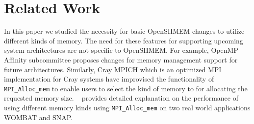 \section{Related Work}
\label{src:relate}
In this paper we studied the necessity for basic OpenSHMEM changes
to utilize different kinds of memory. The need for these features
for supporting upcoming system architectures are not specific to
OpenSHMEM. %
For example, OpenMP~\cite{openmp} Affinity subcommittee proposes changes
for memory management support for future architectures.
Similarly, Cray MPICH which is an optimized MPI
implementation for Cray systems have improvised the functionality of
\texttt{MPI\_Alloc\_mem} to enable users to select the kind of memory to
for allocating the requested memory size. ~\citeauthor{cug17-krishna}
provides detailed explanation on the performance of using different
memory kinds using \texttt{MPI\_Alloc\_mem} on two real world
applications WOMBAT and SNAP.
